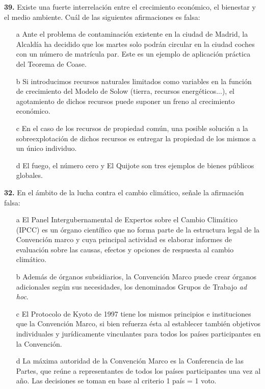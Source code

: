 \documentclass{nuevotema}
\begin{document}

\textbf{39.} Existe una fuerte interrelación entre el crecimiento económico, el bienestar y el medio ambiente. Cuál de las siguientes afirmaciones es falsa:
\begin{itemize}
	\item[a] Ante el problema de contaminación existente en la ciudad de Madrid, la Alcaldía ha decidido que los martes solo podrán circular en la ciudad coches con un número de matrícula par. Este es un ejemplo de aplicación práctica del Teorema de Coase.
	\item[b] Si introducimos recursos naturales limitados como variables en la función de crecimiento del Modelo de Solow (tierra, recursos energéticos...), el agotamiento de dichos recursos puede suponer un freno al crecimiento económico.
	\item[c] En el caso de los recursos de propiedad común, una posible solución a la sobreexplotación de dichos recursos es entregar la propiedad de los mismos a un único individuo.
	\item[d] El fuego, el número cero y El Quijote son tres ejemplos de bienes públicos globales.
\end{itemize}

\textbf{32.} En el ámbito de la lucha contra el cambio climático, señale la afirmación falsa:
\begin{itemize}
	\item[a] El Panel Intergubernamental de Expertos sobre el Cambio Climático (IPCC) es un órgano científico que no forma parte de la estructura legal de la Convención marco y cuya principal actividad es elaborar informes de evaluación sobre las causas, efectos y opciones de respuesta al cambio climático.
	\item[b] Además de órganos subsidiarios, la Convención Marco puede crear órganos adicionales según sus necesidades, los denominados Grupos de Trabajo \textit{ad hoc}.
	\item[c] El Protocolo de Kyoto de 1997 tiene los mismos principios e instituciones que la Convención Marco, si bien refuerza ésta al establecer también objetivos individuales y jurídicamente vinculantes para todos los países participantes en la Convención.
	\item[d] La máxima autoridad de la Convención Marco es la Conferencia de las Partes, que reúne a representantes de todos los países participantes una vez al año. Las decisiones se toman en base al criterio 1 país = 1 voto.
\end{itemize}
\end{document}
